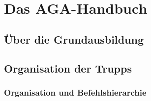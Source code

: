 
\section{Das AGA-Handbuch}

\subsection{Über die Grundausbildung}

\subsection{Organisation der Trupps}


\subsubsection{Organisation und Befehlshierarchie}

